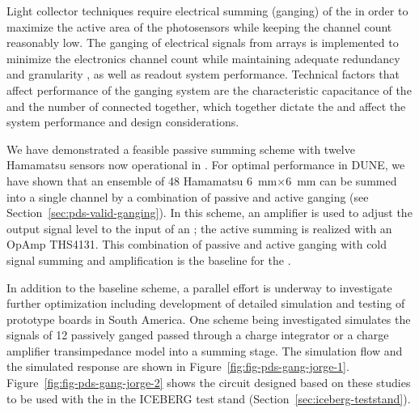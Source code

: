 Light collector techniques require electrical summing (ganging) of the  in order to maximize the active area of the photosensors while keeping the channel count reasonably low. The ganging of electrical signals from  arrays is implemented to minimize the electronics channel count while maintaining adequate redundancy and granularity , as well as readout system performance.  
 Technical factors that affect performance of the ganging system are the characteristic capacitance of the  and the number of  connected together, which together dictate the  and affect the system performance and design considerations.

We have demonstrated a feasible passive summing scheme with twelve Hamamatsu  sensors now operational in . For optimal performance in DUNE, we have shown that an ensemble of 48 Hamamatsu \SI{6}{mm}$\times$\SI{6}{mm}  can be summed into a single channel by a combination of passive and active ganging (see Section~\ref{sec:pds-valid-ganging}).  In this scheme, an amplifier is used to adjust the  output signal level to the input of an ; the active summing is realized with an OpAmp THS4131. This combination of passive and active ganging with cold signal summing and amplification is the baseline for the .


In addition to the baseline scheme, a parallel effort is underway to investigate further optimization including development of detailed simulation and testing of prototype boards in South America. One scheme being investigated simulates the signals of 12 passively ganged  passed through a charge integrator or a charge amplifier transimpedance model into a summing stage. The simulation flow and the simulated response are shown in 
Figure~\ref{fig:fig-pds-gang-jorge-1}. Figure~\ref{fig:fig-pds-gang-jorge-2} shows the circuit designed based on these studies to be used with the  in the ICEBERG test stand (Section~\ref{sec:iceberg-teststand}).

